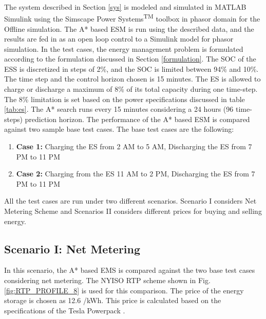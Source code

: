 The system described in Section \ref{sys} is modeled and simulated in MATLAB\textsuperscript{\textregistered} Simulink\textsuperscript{\textregistered} using the Simscape Power Systems\textsuperscript{TM} toolbox in phasor domain for the Offline simulation. The A* based ESM is run using the described data, and the results are fed in as an open loop control to a Simulink model for phasor simulation. In the test cases, the energy management problem is formulated according to the formulation discussed in Section \ref{formulation}. The  SOC of the ESS is discretized in steps of 2\%, and the SOC is limited between  94\%  and  10\%. The time step and the control horizon chosen is 15 minutes. The ES is allowed to charge or discharge a maximum of 8\% of its total capacity during one time-step. The 8\% limitation is set based on the power specifications discussed in table \ref{tab:es}. The A* search runs every 15 minutes considering a 24 hours (96 time-steps) prediction horizon. The performance of the A* based ESM is compared against two sample base test cases. The base test cases are the following:

\begin{enumerate}
\item \textbf{Case 1:} Charging the ES from 2 AM to 5 AM, Discharging the ES from 7 PM to 11 PM

\item \textbf{Case 2:} Charging from the ES 11 AM to 2 PM, Discharging the ES from 7 PM to 11 PM
\end{enumerate}

All the test cases are run under two different scenarios. Scenario I considers Net Metering Scheme and  Scenarios II considers different prices for buying and selling energy. 

\subsection{Scenario I: Net Metering} \label{netmeter}
In this scenario, the A* based EMS is compared against the two base test cases considering net metering. The NYISO RTP scheme shown in Fig. \ref{fig:RTP_PROFILE_8} is used for this comparison. The price of the energy storage is chosen as 12.6 \cent/kWh. This price is calculated based on the specifications of the Tesla Powerpack \cite{tesla_powerpack_2018}.


